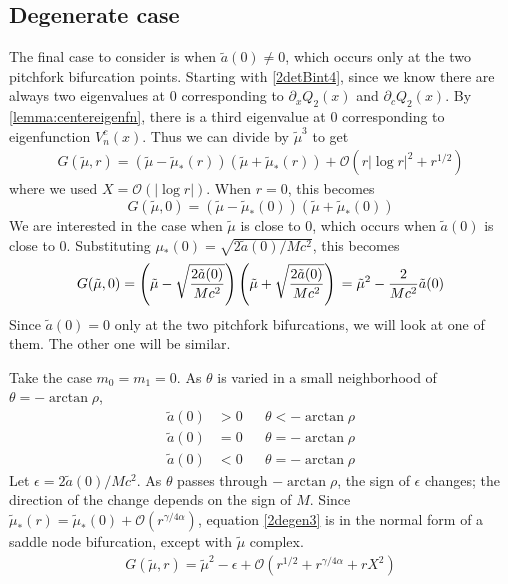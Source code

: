 \documentclass[thesis.tex]{subfiles}
\begin{document}
\subsection{Degenerate case}

The final case to consider is when $\tilde{a}(0) \neq 0$, which occurs only at the two pitchfork bifurcation points. Starting with \cref{2detBint4}, since we know there are always two eigenvalues at 0 corresponding to $\partial_x Q_2(x)$ and $\partial_c Q_2(x)$. By \cref{lemma:centereigenfn}, there is a third eigenvalue at 0 corresponding to eigenfunction $V_n^c(x)$. Thus we can divide by $\tilde{\mu}^3$ to get
\begin{equation}\label{2degen1}
\begin{aligned}
G(\tilde{\mu},r) = (\tilde{\mu} - \tilde{\mu}_*(r))(\tilde{\mu} + \tilde{\mu}_*(r)) + \mathcal{O}\left( r |\log r|^2 + r^{1/2} \right)
\end{aligned}
\end{equation}
where we used $X = \mathcal{O}(|\log r|)$. When $r = 0$, this becomes
\[
G(\tilde{\mu},0) = (\tilde{\mu} - \tilde{\mu}_*(0))(\tilde{\mu} + \tilde{\mu}_*(0))
\]
We are interested in the case when $\tilde{\mu}$ is close to 0, which occurs when $\tilde{a}(0)$ is close to 0. Substituting $\mu_*(0) = \sqrt{2 \tilde{a}(0)/M c^2}$, this becomes
\begin{equation*}
G(\tilde{\mu},0) = \left( \tilde{\mu} - \sqrt{\frac{2 \tilde{a}(0)}{M c^2}} \right)\left(\tilde{\mu} +  \sqrt{\frac{2 \tilde{a}(0)}{M c^2}} \right) \\
= \tilde{\mu}^2 - \frac{2}{M c^2}\tilde{a}(0)
\end{equation*}
Since $\tilde{a}(0) = 0$ only at the two pitchfork bifurcations, we will look at one of them. The other one will be similar. 

Take the case $m_0 = m_1 = 0$. As $\theta$ is varied in a small neighborhood of $\theta = -\arctan \rho$,
\begin{align*}
\tilde{a}(0) &> 0 && \theta < -\arctan \rho \\
\tilde{a}(0) &= 0 && \theta = -\arctan \rho \\
\tilde{a}(0) &< 0 && \theta = -\arctan \rho 
\end{align*}
Let $\epsilon = 2 \tilde{a}(0) / M c^2$. As $\theta$ passes through $-\arctan \rho$, the sign of $\epsilon$ changes; the direction of the change depends on the sign of $M$. Since $\tilde{\mu}_*(r) = \tilde{\mu}_*(0) + \mathcal{O}(r^{\gamma/4\alpha})$, equation \cref{2degen3} is in the normal form of a saddle node bifurcation, except with $\tilde{\mu}$ complex.
\begin{equation}\label{2degen3}
\begin{aligned}
G(\tilde{\mu},r) = \tilde{\mu}^2 - \epsilon + \mathcal{O}( r^{1/2} + r^{\gamma/4\alpha} + rX^2 )
\end{aligned}
\end{equation}
\end{document}
